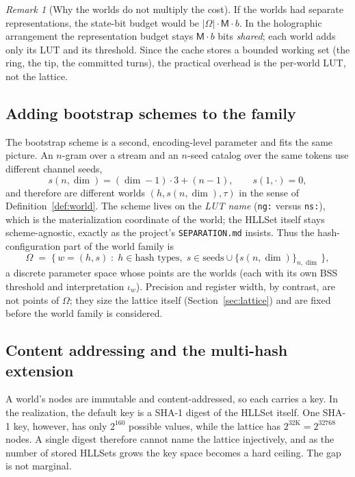 \documentclass[11pt,a4paper]{article}
\theoremstyle{remark}
\newtheorem{remark}[theorem]{Remark}
\newcommand{\Reg}{\ensuremath{\mathsf{M}}}          %
\newcommand{\Bits}{\ensuremath{b}}                  %
\newcommand{\iotaw}{\ensuremath{\iota_{w}}}         %
\begin{document}
\begin{remark}[Why the worlds do not multiply the cost]
If the worlds had separate representations, the state-bit budget would be
$|\Omega|\cdot \Reg\cdot\Bits$. In the holographic arrangement the representation
budget stays $\Reg\cdot\Bits$ bits \emph{shared}; each world adds only its LUT
and its threshold. Since the cache stores a bounded working set (the ring, the
tip, the committed turns), the practical overhead is the per-world LUT, not the
lattice.
\end{remark}

\subsection{Adding bootstrap schemes to the family}
\label{sec:worlds-schemes}

The bootstrap scheme is a second, encoding-level parameter and fits the same
picture. An $n$-gram over a stream and an $n$-seed catalog over the same tokens
use different channel seeds,
\begin{equation}
  s(n,\dim) = (\dim-1)\cdot 3 + (n-1),
  \qquad s(1,\cdot)=0,
\end{equation}
and therefore are different worlds $(h,s(n,\dim),\tau)$ in the sense of
Definition~\ref{def:world}. The scheme lives on the \emph{LUT name}
(\texttt{ng:} versus \texttt{ns:}), which is the materialization coordinate of
the world; the HLLSet itself stays scheme-agnostic, exactly as the project's
\texttt{SEPARATION.md} insists. Thus the hash-configuration part of the world
family is
\begin{equation}
  \Omega \;=\; \bigl\{\,w=(h,s)\;:\; h\in\text{hash types},\;
  s\in\text{seeds}\cup\{s(n,\dim)\}_{n,\dim}\,\bigr\},
\end{equation}
a discrete parameter space whose points are the worlds (each with its own BSS
threshold and interpretation $\iotaw$). Precision and register width, by
contrast, are not points of $\Omega$; they size the lattice itself
(Section~\ref{sec:lattice}) and are fixed before the world family is
considered.

\subsection{Content addressing and the multi-hash extension}
\label{sec:multihash}

A world's nodes are immutable and content-addressed, so each carries a key. In
the realization, the default key is a SHA-1 digest of the HLLSet itself. One
SHA-1 key, however, has only $2^{160}$ possible values, while the lattice has
$2^{32\mathrm{K}} = 2^{32768}$ nodes. A single digest therefore cannot name the
lattice injectively, and as the number of stored HLLSets grows the key space
becomes a hard ceiling. The gap is not marginal.
\end{document}
